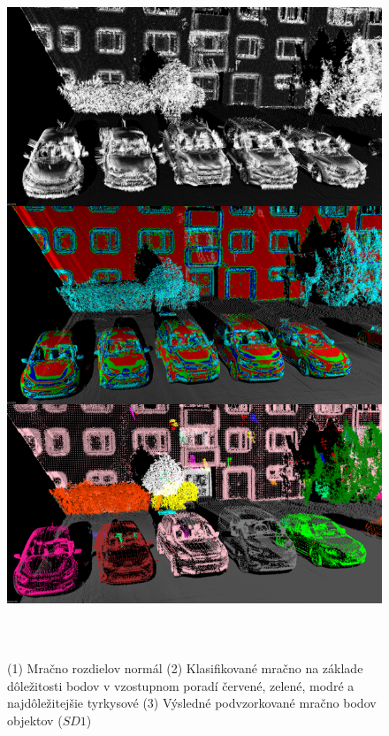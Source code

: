 \newpage\vfill
\begin{figure}[ht]
  \centering
  \includegraphics[width=15cm, height=21cm]{img/downsample_objects.png}
  \caption{(1) Mračno rozdielov normál (2) Klasifikované mračno na základe dôležitosti bodov v vzostupnom poradí červené, zelené, modré a najdôležitejšie tyrkysové (3) Výsledné podvzorkované mračno bodov objektov ($SD1$)} 
  \label{fig:downsampling_objects}
\end{figure} 
\vfill\clearpage


